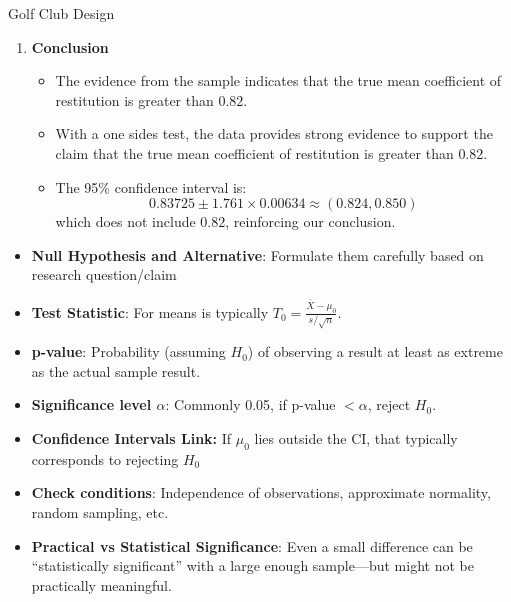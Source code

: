 \documentclass[10pt]{extarticle}
\begin{document}
\begin{examplebox}{Golf Club Design}{}
\begin{enumerate}
        \item \textbf{Conclusion}
              \begin{itemize}
                  \item The evidence from the sample indicates that the true mean coefficient of restitution is greater than $0.82$.
                  \item With a one sides test, the data provides strong evidence to support the claim that the true mean coefficient of restitution is greater than $0.82$.
                  \item The 95\% confidence interval is:
                        $$0.83725 \pm 1.761 \times 0.00634 \approx (0.824, 0.850)$$
                        which does not include $0.82$, reinforcing our conclusion.
              \end{itemize}
    \end{enumerate}
\end{examplebox}
\begin{takeaway-box}{}{}
\begin{itemize}
    \item \textbf{Null Hypothesis and Alternative}: Formulate them carefully based on research question/claim
    \item \textbf{Test Statistic}: For means is typically $T_0 = \frac{\bar{X} - \mu_0}{s/\sqrt{n}}$.
    \item \textbf{p-value}: Probability (assuming $H_0$) of observing a result at least as extreme as the actual sample result.
    \item \textbf{Significance level $\alpha$}: Commonly 0.05, if p-value $< \alpha$, reject $H_0$.
    \item \textbf{Confidence Intervals Link:} If $\mu_0$ lies outside the CI, that typically corresponds to rejecting $H_0$
    \item \textbf{Check conditions}: Independence of observations, approximate normality, random sampling, etc.
    \item \textbf{Practical vs Statistical Significance}: Even a small difference can be “statistically significant” with a large enough sample—but might not be practically meaningful.
\end{itemize}
\end{takeaway-box}
\end{document}
